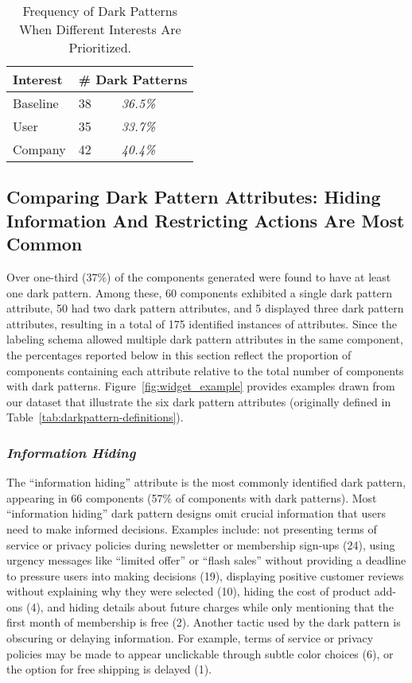 \setlength{\intextsep}{0pt}
\begin{wraptable}[7]{r}{4cm}
\begin{tabular}{l l l}\toprule  
Interest & \multicolumn{2}{l}{\# Dark Patterns} \\\midrule
Baseline & 38 & \textit{36.5\%}\\
User & 35 & \textit{33.7\%}\\
Company & 42 & \textit{40.4\%}\\
\bottomrule
\end{tabular}
\caption{Frequency of Dark Patterns When Different Interests Are Prioritized.}\label{tab:results-interests}
\end{wraptable}

\subsection{Comparing Dark Pattern Attributes: Hiding Information And Restricting Actions Are Most Common} %

Over one-third (37\%) of the components generated were found to have at least one dark pattern. Among these, 60 components exhibited a single dark pattern attribute, 50 had two dark pattern attributes, and 5 displayed three dark pattern attributes, resulting in a total of 175 identified instances of attributes. Since the labeling schema allowed multiple dark pattern attributes %
in the same component, the percentages reported below in this section reflect the proportion of components containing each attribute relative to the total number of components with dark patterns. %
Figure~\ref{fig:widget_example} provides examples drawn from our dataset that illustrate the six dark pattern attributes (originally defined in Table~\ref{tab:darkpattern-definitions}).

\subsubsection{\textit{Information Hiding}} 
The ``information hiding'' attribute is the most commonly identified dark pattern, appearing in 66 components (57\% of components with dark patterns). Most “information hiding” dark pattern designs omit crucial information that users need to make informed decisions. Examples include: not presenting terms of service or privacy policies during newsletter or membership sign-ups (24), using urgency messages like ``limited offer'' or ``flash sales'' without providing a deadline to pressure users into making decisions (19), displaying positive customer reviews without explaining why they were selected (10), hiding the cost of product add-ons (4), and hiding details about future charges while only mentioning that the first month of membership is free (2). Another tactic used by the dark pattern is obscuring or delaying information. For example, terms of service or privacy policies may be made to appear unclickable through subtle color choices (6), or the option for free shipping is delayed (1).


